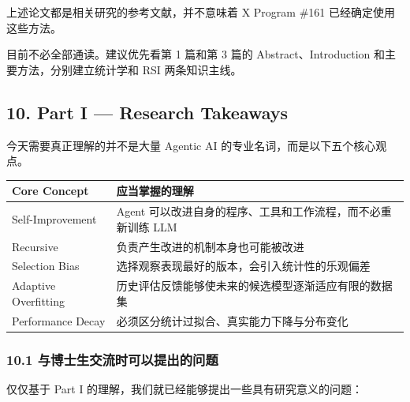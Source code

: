 上述论文都是相关研究的参考文献，并不意味着 X Program \#161 已经确定使用这些方法。

目前不必全部通读。建议优先看第 1 篇和第 3 篇的 Abstract、Introduction 和主要方法，分别建立统计学和 RSI 两条知识主线。

\hypertarget{part-1-03-0001-part-i-research-takeaways}{%
\subsection{10. Part I --- Research Takeaways}\label{part-1-03-0001-part-i-research-takeaways}}

今天需要真正理解的并不是大量 Agentic AI 的专业名词，而是以下五个核心观点。

\begin{readertable}
\begin{longtable}[]{@{}
  >{\raggedright\arraybackslash}p{}
  >{\raggedright\arraybackslash}p{}@{}}
\toprule
Core Concept & 应当掌握的理解 \\
\midrule
\endhead
Self-Improvement & Agent 可以改进自身的程序、工具和工作流程，而不必重新训练 LLM \\
Recursive & 负责产生改进的机制本身也可能被改进 \\
Selection Bias & 选择观察表现最好的版本，会引入统计性的乐观偏差 \\
Adaptive Overfitting & 历史评估反馈能够使未来的候选模型逐渐适应有限的数据集 \\
Performance Decay & 必须区分统计过拟合、真实能力下降与分布变化 \\
\bottomrule
\end{longtable}
\end{readertable}

\hypertarget{part-1-03-0001-ux4e0eux535aux58ebux751fux4ea4ux6d41ux65f6ux53efux4ee5ux63d0ux51faux7684ux95eeux9898}{%
\subsubsection{10.1 与博士生交流时可以提出的问题}\label{part-1-03-0001-ux4e0eux535aux58ebux751fux4ea4ux6d41ux65f6ux53efux4ee5ux63d0ux51faux7684ux95eeux9898}}

仅仅基于 Part I 的理解，我们就已经能够提出一些具有研究意义的问题：

